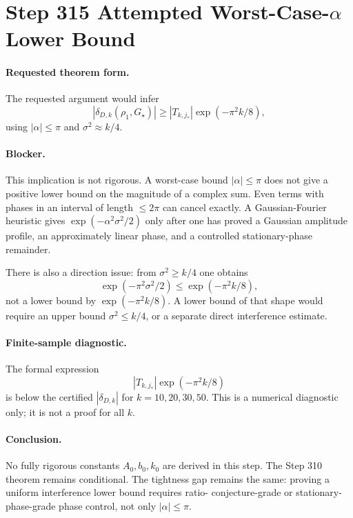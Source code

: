 \section*{Step 315 Attempted Worst-Case-\(\alpha\) Lower Bound}

\paragraph{Requested theorem form.}
The requested argument would infer
\[
|\delta_{D,k}(\rho_1,G_\star)|
\ge |T_{k,j_\ast}|\exp(-\pi^2 k/8),
\]
using \(|\alpha|\le \pi\) and \(\sigma^2\approx k/4\).

\paragraph{Blocker.}
This implication is not rigorous.  A worst-case bound
\(|\alpha|\le\pi\) does not give a positive lower bound on the magnitude
of a complex sum.  Even terms with phases in an interval of length
\(\le 2\pi\) can cancel exactly.  A Gaussian-Fourier heuristic gives
\(\exp(-\alpha^2\sigma^2/2)\) only after one has proved a Gaussian
amplitude profile, an approximately linear phase, and a controlled
stationary-phase remainder.

There is also a direction issue: from \(\sigma^2\ge k/4\) one obtains
\[
\exp(-\pi^2\sigma^2/2)\le \exp(-\pi^2 k/8),
\]
not a lower bound by \(\exp(-\pi^2 k/8)\).  A lower bound of that shape
would require an upper bound \(\sigma^2\le k/4\), or a separate direct
interference estimate.

\paragraph{Finite-sample diagnostic.}
The formal expression
\[
|T_{k,j_\ast}|\exp(-\pi^2k/8)
\]
is below the certified \(|\delta_{D,k}|\) for \(k=10,20,30,50\).  This
is a numerical diagnostic only; it is not a proof for all \(k\).

\paragraph{Conclusion.}
No fully rigorous constants \(A_0,b_0,k_0\) are derived in this step.
The Step 310 theorem remains conditional.  The tightness gap remains the
same: proving a uniform interference lower bound requires ratio-
conjecture-grade or stationary-phase-grade phase control, not only
\(|\alpha|\le\pi\).
